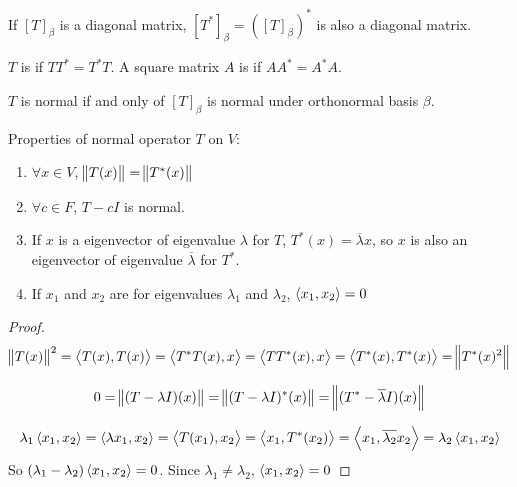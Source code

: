 \begin{theorem}
    If $[T]_\beta$ is a diagonal matrix, $[T^*]_\beta = ([T]_\beta)^*$ is also a diagonal matrix.
\end{theorem}



\begin{definition}
    $T$ is  if $T T^* = T^* T$. A square matrix $A$ is  if $AA^* = A^* A$.
\end{definition}

\begin{theorem}
    $T$ is normal if and only of $[T]_\beta$ is normal under orthonormal basis $\beta$.
\end{theorem}

\begin{theorem}\label{propertyofnormaloperator}
    Properties of normal operator $T$ on $V$:
    \begin{enumerate}
        \item $\forall x \in V$, $\norm{T(x)} = \norm{T^*(x)}$
        \item $\forall c \in F$, $T - cI$ is normal.
        \item If $x$ is a eigenvector of eigenvalue $\lambda$ for $T$, $T^*(x) = \overline{\lambda} x$, so $x$ is also an eigenvector of eigenvalue $\overline{\lambda}$ for $T^*$.
        \item If $x_1$ and $x_2$ are for eigenvalues $\lambda_1$ and $\lambda_2$, $\left\langle \displaystyle x_1, x_2 \right\rangle = 0$
    \end{enumerate}    
\end{theorem}
\begin{proof}
    \begin{equation*}
        \norm{T(x)}^2 = \left\langle \displaystyle T(x), T(x) \right\rangle = \left\langle \displaystyle T^* T (x), x \right\rangle = \left\langle \displaystyle TT^*(x), x \right\rangle = \left\langle \displaystyle T^*(x), T^*(x) \right\rangle = \norm{T^*(x)^2}
    \end{equation*}
    
    \begin{equation*}
        0 = \norm{(T - \lambda I)(x)} = \norm{(T - \lambda I)^*(x)} = \norm{(T^* - \overline{\lambda} I)(x) }
    \end{equation*}
    
    \begin{equation*}
        \lambda_1 \left\langle \displaystyle x_1, x_2 \right\rangle = \left\langle \displaystyle \lambda x_1, x_2 \right\rangle = \left\langle \displaystyle T(x_1), x_2 \right\rangle = \left\langle \displaystyle x_1, T^*(x_2) \right\rangle = \left\langle \displaystyle x_1, \overline{\lambda_2} x_2 \right\rangle = \lambda_2 \left\langle \displaystyle x_1, x_2 \right\rangle
    \end{equation*}
    So $(\lambda_1 - \lambda_2) \left\langle \displaystyle x_1, x_2 \right\rangle = 0$. Since $\lambda_1 \neq \lambda_2$, $\left\langle \displaystyle x_1, x_2 \right\rangle = 0$
\end{proof}


